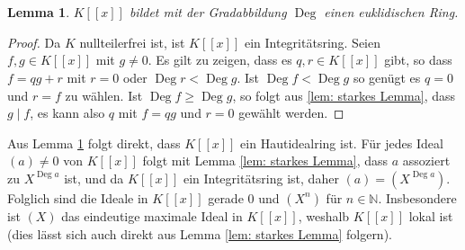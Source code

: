 \documentclass[a4paper,10pt]{article}
\newcounter{satze}
\newtheorem{lem}[satze]{Lemma}
\theoremstyle{definition}
\newcommand{\N}{\mathbb{N}}
\newcommand{\Deg}{\operatorname{Deg}}
\begin{document}
\section{}
\begin{lem}\label{lem: K[[x]] euklidisch}
 $K[\![x]\!]$ bildet mit der Gradabbildung $\Deg$ einen euklidischen Ring.
\end{lem}
\begin{proof}
 Da $K$ nullteilerfrei ist, ist $K[\![x]\!]$ ein Integritätsring. Seien $f,g \in K[\![x]\!]$ mit $g \neq 0$. Es gilt zu zeigen, dass es $q,r \in K[\![x]\!]$ gibt, so dass $f = qg + r$ mit $r = 0$ oder $\Deg r < \Deg g$. Ist $\Deg f < \Deg g$ so genügt es $q=0$ und $r=f$ zu wählen. Ist $\Deg f \geq \Deg g$, so folgt aus \ref{lem: starkes Lemma}, dass $g \mid f$, es kann also $q$ mit $f = qg$ und $r=0$ gewählt werden.
\end{proof}

Aus Lemma \ref{lem: K[[x]] euklidisch} folgt direkt, dass $K[\![x]\!]$ ein Hautidealring ist. Für jedes Ideal $(a) \neq 0$ von $K[\![x]\!]$ folgt mit Lemma \ref{lem: starkes Lemma}, dass $a$ assoziert zu $X^{\Deg a}$ ist, und da $K[\![x]\!]$ ein Integritätsring ist, daher $(a) = \left(X^{\Deg a}\right)$. Folglich sind die Ideale in $K[\![x]\!]$ gerade $0$ und $\left(X^n\right)$ für $n \in \N$. Insbesondere ist $(X)$ das eindeutige maximale Ideal in $K[\![x]\!]$, weshalb $K[\![x]\!]$ lokal ist (dies lässt sich auch direkt aus Lemma \ref{lem: starkes Lemma} folgern).
\end{document}
